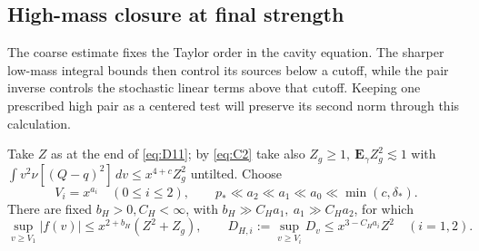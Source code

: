 \subsection{High-mass closure at final strength}
The coarse estimate fixes the Taylor order in the cavity equation.
The sharper low-mass integral bounds then control its sources below a
cutoff, while the pair inverse controls the stochastic linear terms
above that cutoff. Keeping one prescribed high pair as a centered test
will preserve its second norm through this calculation.

\begin{proposition}\label{prop:statistics-high}

Take \(Z\) as at the end of \eqref{eq:D11}; by \eqref{eq:C2} take also \(Z_g\ge1,\ \mathbf E_\gamma Z_g^2\lesssim1\) with \(\int v^2\nu[(Q-q)^2]\,dv\le x^{4+c} Z_g^2\) untilted. Choose
\begin{equation*}
V_i=x^{a_i}\quad(0\le i\le2),\qquad
 p_*\ll a_2\ll a_1\ll a_0\ll\min(c,\delta_*).
\end{equation*}
There are fixed \(b_H>0,C_H<\infty\), with \(b_H\gg C_Ha_1,\ a_1\gg C_Ha_2\), for which
\begin{equation}
\sup_{v\ge V_1}|f(v)|\le x^{2+b_H}(Z^2+Z_g),\qquad
 D_{H,i}:=\sup_{v\ge V_i}D_v\le x^{3-C_H a_i}Z^2\quad(i=1,2).       \tag{D15}\label{eq:D15}
\end{equation}

\end{proposition}

